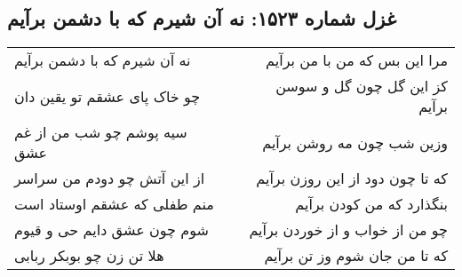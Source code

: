 \begin{center}
\section*{غزل شماره ۱۵۲۳: نه آن شیرم که با دشمن برآیم}
\label{sec:1523}
\begin{longtable}{l p{0.5cm} r}
نه آن شیرم که با دشمن برآیم
&&
مرا این بس که من با من برآیم
\\
چو خاک پای عشقم تو یقین دان
&&
کز این گل چون گل و سوسن برآیم
\\
سیه پوشم چو شب من از غم عشق
&&
وزین شب چون مه روشن برآیم
\\
از این آتش چو دودم من سراسر
&&
که تا چون دود از این روزن برآیم
\\
منم طفلی که عشقم اوستاد است
&&
بنگذارد که من کودن برآیم
\\
شوم چون عشق دایم حی و قیوم
&&
چو من از خواب و از خوردن برآیم
\\
هلا تن زن چو بوبکر ربابی
&&
که تا من جان شوم وز تن برآیم
\\
\end{longtable}
\end{center}
